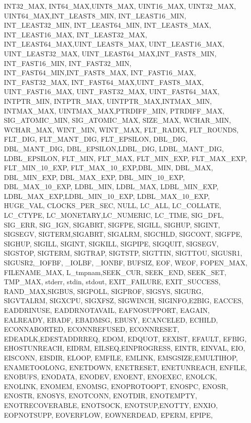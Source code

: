 {{        INT32_MAX, INT64_MAX,UINT8_MAX, UINT16_MAX, UINT32_MAX,%
        UINT64_MAX,INT_LEAST8_MIN, INT_LEAST16_MIN, INT_LEAST32_MIN, INT_LEAST64_MIN,%
        INT_LEAST8_MAX, INT_LEAST16_MAX, INT_LEAST32_MAX, INT_LEAST64_MAX,UINT_LEAST8_MAX,%
        UINT_LEAST16_MAX, UINT_LEAST32_MAX, UINT_LEAST64_MAX,INT_FAST8_MIN, INT_FAST16_MIN,%
        INT_FAST32_MIN, INT_FAST64_MIN,INT_FAST8_MAX, INT_FAST16_MAX, INT_FAST32_MAX,%
        INT_FAST64_MAX,UINT_FAST8_MAX, UINT_FAST16_MAX, UINT_FAST32_MAX, UINT_FAST64_MAX,%
        INTPTR_MIN, INTPTR_MAX, UINTPTR_MAX,INTMAX_MIN, INTMAX_MAX,%
        UINTMAX_MAX,PTRDIFF_MIN, PTRDIFF_MAX, SIG_ATOMIC_MIN, SIG_ATOMIC_MAX,%
        SIZE_MAX, WCHAR_MIN, WCHAR_MAX, WINT_MIN, WINT_MAX,%
        FLT_RADIX, FLT_ROUNDS, FLT_DIG, FLT_MANT_DIG, FLT_EPSILON,%
        DBL_DIG, DBL_MANT_DIG, DBL_EPSILON,LDBL_DIG, LDBL_MANT_DIG,%
        LDBL_EPSILON, FLT_MIN, FLT_MAX, FLT_MIN_EXP, FLT_MAX_EXP,%
        FLT_MIN_10_EXP, FLT_MAX_10_EXP,DBL_MIN, DBL_MAX, DBL_MIN_EXP,%
        DBL_MAX_EXP, DBL_MIN_10_EXP, DBL_MAX_10_EXP, LDBL_MIN, LDBL_MAX,%
        LDBL_MIN_EXP, LDBL_MAX_EXP,LDBL_MIN_10_EXP, LDBL_MAX_10_EXP, HUGE_VAL,%
        CLOCKS_PER_SEC, NULL, LC_ALL, LC_COLLATE, LC_CTYPE,%
        LC_MONETARY,LC_NUMERIC, LC_TIME, SIG_DFL, SIG_ERR,%
        SIG_IGN, SIGABRT, SIGFPE, SIGILL, SIGHUP,%
        SIGINT, SIGSEGV, SIGTERM,SIGABRT, SIGALRM,%
        SIGCHLD, SIGCONT, SIGFPE, SIGHUP, SIGILL,%
        SIGINT, SIGKILL, SIGPIPE, SIGQUIT, SIGSEGV,%
        SIGSTOP, SIGTERM, SIGTRAP, SIGTSTP, SIGTTIN,%
        SIGTTOU, SIGUSR1, SIGUSR2,_IOFBF, _IOLBF,%
        _IONBF, BUFSIZ, EOF, WEOF, FOPEN_MAX,%
        FILENAME_MAX, L_tmpnam,SEEK_CUR, SEEK_END, SEEK_SET,%
        TMP_MAX, stderr, stdin, stdout, EXIT_FAILURE,%
        EXIT_SUCCESS, RAND_MAX,SIGBUS, SIGPOLL, SIGPROF,%
        SIGSYS, SIGURG, SIGVTALRM, SIGXCPU, SIGXFSZ,%
        SIGWINCH, SIGINFO,E2BIG, EACCES, EADDRINUSE,%
        EADDRNOTAVAIL, EAFNOSUPPORT, EAGAIN, EALREADY, EBADF,%
        EBADMSG, EBUSY, ECANCELED, ECHILD, ECONNABORTED,%
        ECONNREFUSED, ECONNRESET, EDEADLK,EDESTADDRREQ, EDOM,%
        EDQUOT, EEXIST, EFAULT, EFBIG, EHOSTUNREACH,%
        EIDRM, EILSEQ,EINPROGRESS, EINTR, EINVAL,%
        EIO, EISCONN, EISDIR, ELOOP, EMFILE,%
        EMLINK, EMSGSIZE,EMULTIHOP, ENAMETOOLONG, ENETDOWN,%
        ENETRESET, ENETUNREACH, ENFILE, ENOBUFS, ENODATA,%
        ENODEV, ENOENT, ENOEXEC, ENOLCK, ENOLINK,%
        ENOMEM, ENOMSG, ENOPROTOOPT, ENOSPC, ENOSR,%
        ENOSTR, ENOSYS, ENOTCONN, ENOTDIR, ENOTEMPTY,%
        ENOTRECOVERABLE, ENOTSOCK, ENOTSUP,ENOTTY, ENXIO,%
        EOPNOTSUPP, EOVERFLOW, EOWNERDEAD, EPERM, EPIPE,%
}}
